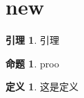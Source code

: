 \documentclass[11pt,a4paper]{ctexart}
\theoremstyle{definition}
\newtheorem{lem}[lem]{引理}
\newtheorem{prop}[prop]{命题}
\newtheorem{definition}[definition]{定义}
\begin{document}
\section{new}

\begin{lem}
    引理
\end{lem}

\begin{prop}
    proo
\end{prop}

\begin{definition}
    这是定义
\end{definition}
\end{document}

